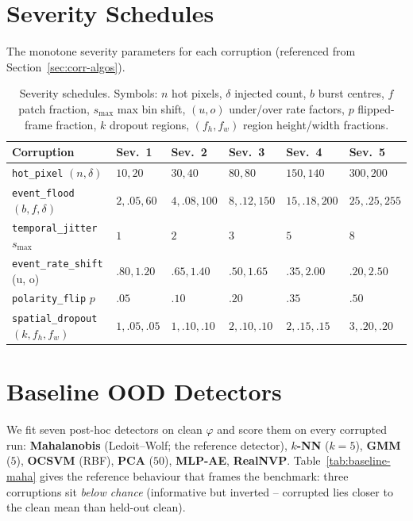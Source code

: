 ﻿\documentclass{article} %
\theoremstyle{remark}
\begin{document}
\section{Severity Schedules}
\label{app:severity-schedules}
The monotone severity parameters for each corruption (referenced from Section~\ref{sec:corr-algos}).
\begin{table}[t]
  \centering\small
  \caption{Severity schedules. Symbols: $n$ hot pixels, $\delta$ injected count, $b$ burst
  centres, $f$ patch fraction, $s_{\max}$ max bin shift, $(u,o)$ under/over rate factors, $p$
  flipped-frame fraction, $k$ dropout regions, $(f_h,f_w)$ region height/width fractions.}
  \label{tab:corr-severity}
  \begin{tabularx}{\linewidth}{@{}l X X X X X@{}}
    \toprule
    Corruption & Sev.\ 1 & Sev.\ 2 & Sev.\ 3 & Sev.\ 4 & Sev.\ 5 \\
    \midrule
    \texttt{hot\_pixel} $(n,\delta)$        & $10,20$  & $30,40$  & $80,80$   & $150,140$ & $300,200$ \\
    \texttt{event\_flood} $(b,f,\delta)$    & $2,.05,60$ & $4,.08,100$ & $8,.12,150$ & $15,.18,200$ & $25,.25,255$ \\
    \texttt{temporal\_jitter} $s_{\max}$    & $1$ & $2$ & $3$ & $5$ & $8$ \\
    \texttt{event\_rate\_shift} (u, o)      & $.80,1.20$ & $.65,1.40$ & $.50,1.65$ & $.35,2.00$ & $.20,2.50$ \\
    \texttt{polarity\_flip} $p$             & $.05$ & $.10$ & $.20$ & $.35$ & $.50$ \\
    \texttt{spatial\_dropout} $(k,f_h,f_w)$ & $1,.05,.05$ & $1,.10,.10$ & $2,.10,.10$ & $2,.15,.15$ & $3,.20,.20$ \\
    \bottomrule
  \end{tabularx}
\end{table}

\section{Baseline OOD Detectors}
\label{app:baselines}
We fit seven post-hoc detectors on clean $\varphi$ and score them on
every corrupted run: \textbf{Mahalanobis} (Ledoit--Wolf; the
reference detector), \textbf{$k$-NN} ($k=5$), \textbf{GMM} ($5$), \textbf{OCSVM} (RBF),
\textbf{PCA} ($50$), \textbf{MLP-AE}, \textbf{RealNVP}. Table~\ref{tab:baseline-maha} gives the
reference behaviour that frames the benchmark: three corruptions sit \emph{below chance}
(informative but inverted -- corrupted lies closer to the clean mean than held-out clean).
\end{document}
